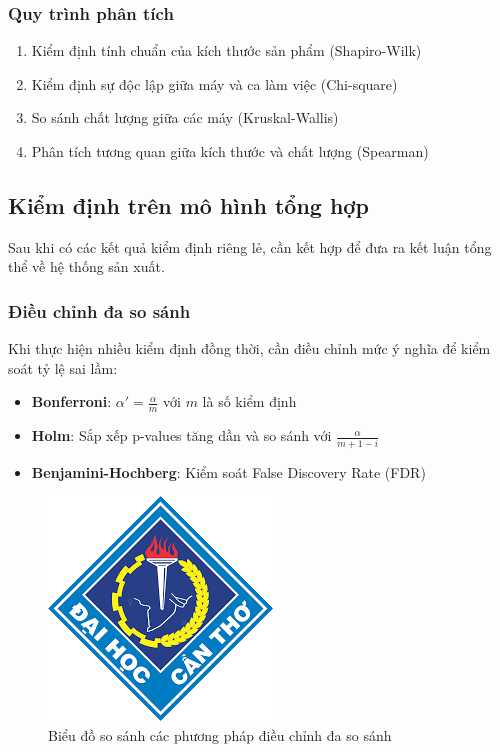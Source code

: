 \subsubsection*{Quy trình phân tích}
\begin{enumerate}
    \item Kiểm định tính chuẩn của kích thước sản phẩm (Shapiro-Wilk)
    \item Kiểm định sự độc lập giữa máy và ca làm việc (Chi-square)
    \item So sánh chất lượng giữa các máy (Kruskal-Wallis)
    \item Phân tích tương quan giữa kích thước và chất lượng (Spearman)
\end{enumerate}

\subsection{Kiểm định trên mô hình tổng hợp}
Sau khi có các kết quả kiểm định riêng lẻ, cần kết hợp để đưa ra kết luận tổng thể về hệ thống sản xuất.

\subsubsection*{Điều chỉnh đa so sánh}
Khi thực hiện nhiều kiểm định đồng thời, cần điều chỉnh mức ý nghĩa để kiểm soát tỷ lệ sai lầm:

\begin{itemize}
    \item \textbf{Bonferroni}: $\alpha' = \frac{\alpha}{m}$ với $m$ là số kiểm định
    \item \textbf{Holm}: Sắp xếp p-values tăng dần và so sánh với $\frac{\alpha}{m+1-i}$
    \item \textbf{Benjamini-Hochberg}: Kiểm soát False Discovery Rate (FDR)
\end{itemize}

\begin{figure}[h!]
    \centering
    \includegraphics[width=.8\linewidth]{../../assets/logos/university-logo.png}
    \caption{Biểu đồ so sánh các phương pháp điều chỉnh đa so sánh}
\end{figure}

